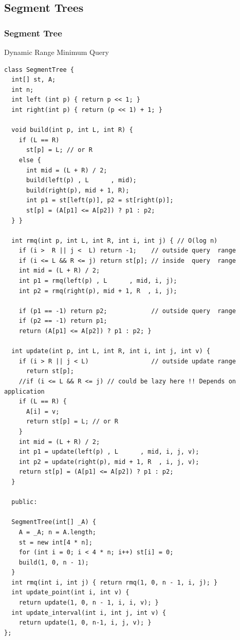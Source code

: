 \documentclass[10pt,svgnames,usenames,table]{beamer} %
\begin{document}
\subsection{Segment Trees}
\begin{frame}
  \frametitle{Segment Tree}
  Dynamic Range Minimum Query
  \begin{lstlisting}
class SegmentTree {
  int[] st, A;
  int n;
  int left (int p) { return p << 1; }
  int right(int p) { return (p << 1) + 1; }

  void build(int p, int L, int R) {
    if (L == R)
      st[p] = L; // or R
    else {
      int mid = (L + R) / 2;
      build(left(p) , L      , mid);
      build(right(p), mid + 1, R);
      int p1 = st[left(p)], p2 = st[right(p)];
      st[p] = (A[p1] <= A[p2]) ? p1 : p2;
  } }

  int rmq(int p, int L, int R, int i, int j) { // O(log n)
    if (i >  R || j <  L) return -1;    // outside query  range
    if (i <= L && R <= j) return st[p]; // inside  query  range
    int mid = (L + R) / 2;
    int p1 = rmq(left(p) , L      , mid, i, j);
    int p2 = rmq(right(p), mid + 1, R  , i, j);

    if (p1 == -1) return p2;            // outside query  range
    if (p2 == -1) return p1;
    return (A[p1] <= A[p2]) ? p1 : p2; }

  int update(int p, int L, int R, int i, int j, int v) {
    if (i > R || j < L)                 // outside update range
      return st[p];
    //if (i <= L && R <= j) // could be lazy here !! Depends on application
    if (L == R) {
      A[i] = v;
      return st[p] = L; // or R
    }
    int mid = (L + R) / 2;
    int p1 = update(left(p) , L      , mid, i, j, v);
    int p2 = update(right(p), mid + 1, R  , i, j, v);
    return st[p] = (A[p1] <= A[p2]) ? p1 : p2;
  }

  public:

  SegmentTree(int[] _A) {
    A = _A; n = A.length;
    st = new int[4 * n];
    for (int i = 0; i < 4 * n; i++) st[i] = 0;
    build(1, 0, n - 1);
  }
  int rmq(int i, int j) { return rmq(1, 0, n - 1, i, j); }
  int update_point(int i, int v) {
    return update(1, 0, n - 1, i, i, v); }
  int update_interval(int i, int j, int v) {
    return update(1, 0, n-1, i, j, v); }
};
  \end{lstlisting}
\end{frame}
\end{document}
